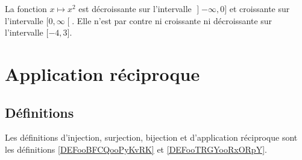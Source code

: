 \begin{example}
    La fonction \( x\mapsto x^2\) est décroissante sur l'intervalle \( \mathopen] -\infty , 0 \mathclose]\) et croissante sur l'intervalle \( \mathopen[ 0 , \infty \mathclose[\). Elle n'est par contre ni croissante ni décroissante sur l'intervalle \( \mathopen[ -4 , 3 \mathclose]\).
\end{example}

\section{Application réciproque}

\subsection{Définitions}

Les définitions d'injection, surjection, bijection et d'application réciproque sont les définitions \ref{DEFooBFCQooPyKvRK} et \ref{DEFooTRGYooRxORpY}.

